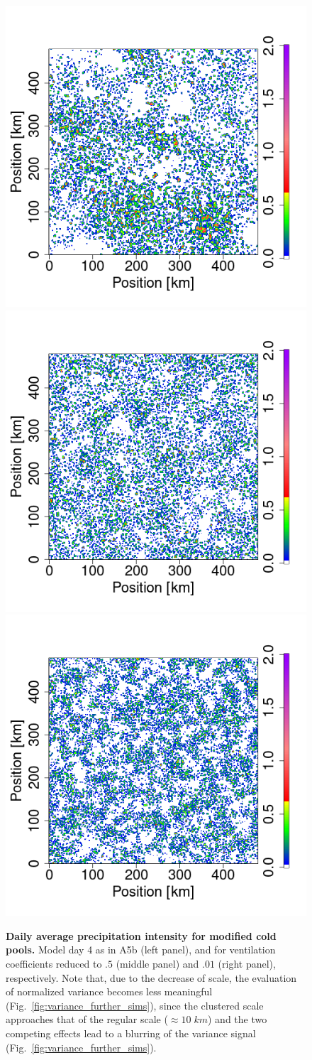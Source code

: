 \documentclass{article}
\begin{document}
\begin{figure}[ht]
\includegraphics[trim={2cm 2.4cm 1cm 1cm}, clip, height=0.11\linewidth]{var1_daymean_T0_300K_ampl_10_1km_909-1176.png}
\includegraphics[trim={2cm 2.4cm 1cm 1cm}, clip, height=0.11\linewidth]{var1_daymean_T0_300K_ampl_10_1km_05vent_433-576.png}
\includegraphics[trim={2cm 2.4cm 1cm 1cm}, clip, height=0.11\linewidth]{var1_daymean_T0_300K_ampl_10_1km_001vent_433-576.png}
\caption{{\bf Daily average precipitation intensity for modified cold pools.} 
Model day 4 as in A5b (left panel), and for ventilation coefficients reduced to $.5$ (middle panel) and $.01$ (right panel), respectively.
Note that, due to the decrease of scale, the evaluation of normalized variance becomes less meaningful (Fig.~\ref{fig:variance_further_sims}), since the clustered scale approaches that of the regular scale ($\approx 10\;km$) and the two competing effects lead to a blurring of the variance signal (Fig.~\ref{fig:variance_further_sims}).
}
\label{fig:daily_sum_vent}
\end{figure}
\end{document}

